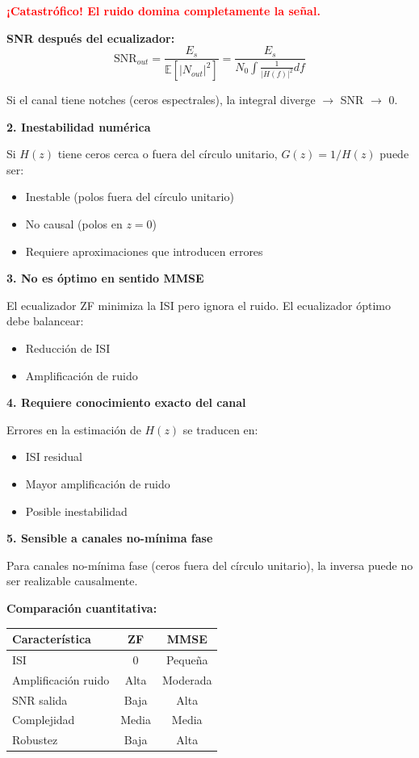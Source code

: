 \documentclass[11pt,a4paper]{article}
\begin{document}
\textcolor{red}{\textbf{¡Catastr\'ofico! El ruido domina completamente la se\~nal.}}

\textbf{SNR despu\'es del ecualizador:}
\[
\text{SNR}_{out} = \frac{E_s}{\mathbb{E}[|N_{out}|^2]} = \frac{E_s}{N_0 \int \frac{1}{|H(f)|^2} df}
\]

Si el canal tiene notches (ceros espectrales), la integral diverge $\to$ SNR $\to$ 0.

\textbf{2. Inestabilidad num\'erica}

Si $H(z)$ tiene ceros cerca o fuera del c\'irculo unitario, $G(z) = 1/H(z)$ puede ser:
\begin{itemize}
    \item Inestable (polos fuera del c\'irculo unitario)
    \item No causal (polos en $z = 0$)
    \item Requiere aproximaciones que introducen errores
\end{itemize}

\textbf{3. No es \'optimo en sentido MMSE}

El ecualizador ZF minimiza la ISI pero ignora el ruido. El ecualizador \'optimo debe balancear:
\begin{itemize}
    \item Reducci\'on de ISI
    \item Amplificaci\'on de ruido
\end{itemize}

\textbf{4. Requiere conocimiento exacto del canal}

Errores en la estimaci\'on de $H(z)$ se traducen en:
\begin{itemize}
    \item ISI residual
    \item Mayor amplificaci\'on de ruido
    \item Posible inestabilidad
\end{itemize}

\textbf{5. Sensible a canales no-m\'inima fase}

Para canales no-m\'inima fase (ceros fuera del c\'irculo unitario), la inversa puede no ser realizable causalmente.

\vspace{0.5cm}
\textbf{Comparaci\'on cuantitativa:}

\begin{center}
\begin{tabular}{|l|c|c|}
\hline
\textbf{Caracter\'istica} & \textbf{ZF} & \textbf{MMSE} \\
\hline
ISI & 0 & Peque\~na \\
Amplificaci\'on ruido & Alta & Moderada \\
SNR salida & Baja & Alta \\
Complejidad & Media & Media \\
Robustez & Baja & Alta \\
\hline
\end{tabular}
\end{center}
\end{document}
